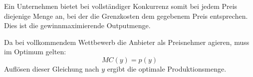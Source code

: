 Ein Unternehmen bietet bei vollständiger Konkurrenz somit bei jedem Preis diejenige Menge an, bei der die Grenzkosten dem gegebenem Preis entsprechen. Dies ist die gewinnmaximierende Outputmenge.

\begin{kr}
	Da bei vollkommendem Wettbewerb die Anbieter als Preisnehmer agieren, muss im Optimum gelten:
	$$ MC(y) = p(y) $$
	Auflösen dieser Gleichung nach $y$ ergibt die optimale Produktionsmenge.
\end{kr} %

